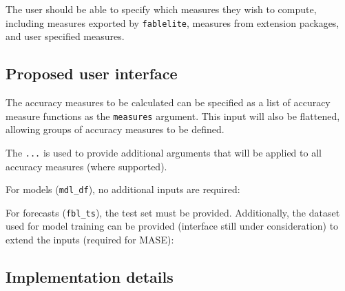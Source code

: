 \documentclass[]{book}
\newenvironment{Shaded}{\begin{snugshade}}{\end{snugshade}}
\newcommand{\DataTypeTok}[1]{\textcolor[rgb]{0.13,0.29,0.53}{#1}}
\newcommand{\KeywordTok}[1]{\textcolor[rgb]{0.13,0.29,0.53}{\textbf{#1}}}
\newcommand{\NormalTok}[1]{#1}
\newcommand{\OperatorTok}[1]{\textcolor[rgb]{0.81,0.36,0.00}{\textbf{#1}}}
\newcommand{\OtherTok}[1]{\textcolor[rgb]{0.56,0.35,0.01}{#1}}
\newcommand{\StringTok}[1]{\textcolor[rgb]{0.31,0.60,0.02}{#1}}
\begin{document}
The user should be able to specify which measures they wish to compute, including measures exported by \texttt{fablelite}, measures from extension packages, and user specified measures.

\hypertarget{proposed-user-interface}{%
\subsection{Proposed user interface}\label{proposed-user-interface}}

The accuracy measures to be calculated can be specified as a list of accuracy measure functions as the \texttt{measures} argument. This input will also be flattened, allowing groups of accuracy measures to be defined.

The \texttt{...} is used to provide additional arguments that will be applied to all accuracy measures (where supported).

For models (\texttt{mdl\_df}), no additional inputs are required:

\begin{Shaded}
\end{Shaded}

For forecasts (\texttt{fbl\_ts}), the test set must be provided. Additionally, the dataset used for model training can be provided (interface still under consideration) to extend the inputs (required for MASE):

\begin{Shaded}
\end{Shaded}

\hypertarget{implementation-details}{%
\subsection{Implementation details}\label{implementation-details}}
\end{document}
